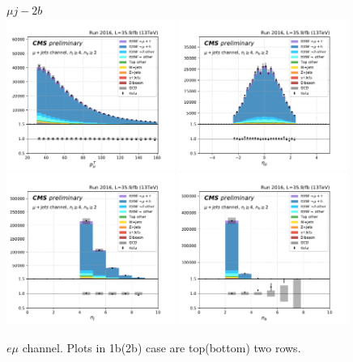 \begin{figure}[ht]
    \centering
    $\mu j - 2b$ \\
    \includegraphics[width=0.49\textwidth]{chapters/Appendix/sectionPlots/figures/kinematics_pickles/mu4j/2b/mu4j_2b_lepton1_pt.pdf}
    \includegraphics[width=0.49\textwidth]{chapters/Appendix/sectionPlots/figures/kinematics_pickles/mu4j/2b/mu4j_2b_lepton1_eta.pdf}
    \includegraphics[width=0.49\textwidth]{chapters/Appendix/sectionPlots/figures/kinematics_pickles/mu4j/2b/mu4j_2b_nJets.pdf}
    \includegraphics[width=0.49\textwidth]{chapters/Appendix/sectionPlots/figures/kinematics_pickles/mu4j/2b/mu4j_2b_nBJets.pdf}
    
    \caption{$e\mu$ channel. Plots in 1b(2b) case are top(bottom) two rows.}
\end{figure}
